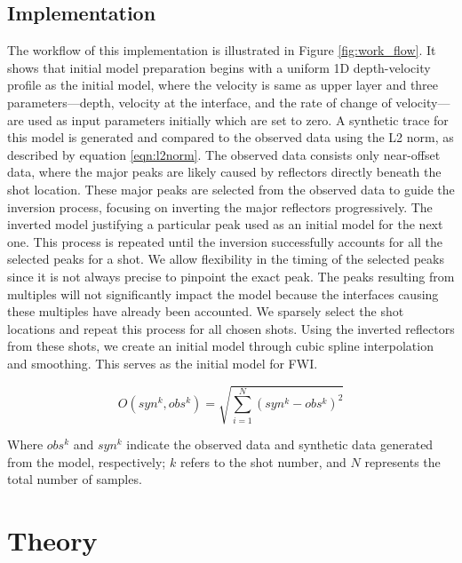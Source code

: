\documentclass[paper,revised]{geophysics}
\begin{document}
\subsection{Implementation}
The workflow of this implementation is illustrated in Figure \ref{fig:work_flow}. It shows that initial model preparation begins with a uniform 1D depth-velocity profile as the initial model, where the velocity is same as upper layer and three parameters—depth, velocity at the interface, and the rate of change of velocity—are used as input parameters initially which are set to zero. A synthetic trace for this model is generated and compared to the observed data using the L2 norm, as described by equation \ref{eqn:l2norm}.
The observed data consists only near-offset data, where the major peaks are likely caused by reflectors directly beneath the shot location. These major peaks are selected from the observed data to guide the inversion process, focusing on inverting the major reflectors progressively. The inverted model justifying a particular peak used as an initial model for the next one. This process is repeated until the inversion successfully accounts for all the selected peaks for a shot. We allow flexibility in the timing of the selected peaks since it is not always precise to pinpoint the exact peak. The peaks resulting from multiples will not significantly impact the model because the interfaces causing these multiples have already been accounted.
We sparsely select the shot locations and repeat this process for all chosen shots. Using the inverted reflectors from these shots, we create an initial model through cubic spline interpolation and smoothing. This serves as the initial model for FWI.


\begin{equation}
	O(syn^k, obs^k) = \sqrt{\sum_{i=1}^{N} \left( syn^k - obs^k \right)^2}
	\label{eqn:l2norm}
\end{equation}

Where \(obs^k\) and \(syn^k\) indicate the observed data and synthetic data generated from the model, respectively; \(k\) refers to the shot number, and \(N\) represents the total number of samples.

\section*{Theory}
\end{document}

